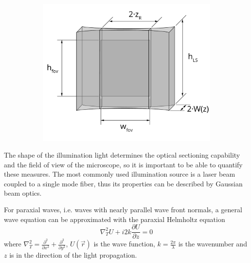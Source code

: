 \begin{figure}
\begin{subfigure}[b]{0.29\textwidth}
          \caption{}
          \label{fig:height}
      \end{subfigure}
      \begin{subfigure}[b]{0.39\textwidth}
          \centering
          \includegraphics[width=\textwidth]{FOV}
          \caption{}
          \label{fig:fov}
      \end{subfigure}
      \label{fig:ls_dim}
    \end{figure}

    The shape of the illumination light determines the optical sectioning capability and the field of view of the microscope, so it is important to be able to quantify these measures. The most commonly used illumination source is a laser beam coupled to a single mode fiber, thus its properties can be described by Gaussian beam optics.

    For paraxial waves, i.e. waves with nearly parallel wave front normals, a general wave equation can be approximated with the paraxial Helmholtz equation \cite{saleh_fundamentals_2007}
    \begin{equation}
      \nabla_T^2 U + i 2k \frac{\partial U}{\partial z} = 0
      \label{eq:helmholtz}
    \end{equation}
    where $\nabla_T^2 = \frac{\partial^2}{\partial x^2} + \frac{\partial^2}{\partial y^2}$, $U(\vec{r})$ is the wave function, $k=\frac{2\pi}{\lambda}$ is the wavenumber and $z$ is in the direction of the light propagation.
    
